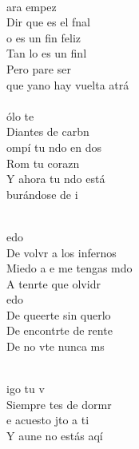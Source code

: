 \begin{cancion}[Miedo][M Clan]%
	    \\
	ara empez\\
	Dir que es el fnal\\
	o es un fin feliz\\
	Tan lo es un finl \\
	Pero pare ser \\
	que yano hay vuelta atrá    \\
\jump\\
	ólo te \\
	Diantes de carbn \\
	ompí tu ndo en dos\\
	Rom tu corazn  \\
	Y ahora tu ndo está\\
	burándose de i       \\\jump\\
	\begin{chorus}%
	edo\\
	De volvr a los infernos\\
	Miedo a e me tengas mdo\\
	A tenrte que olvidr      \\
	edo\\
	De queerte sin querlo\\
	De encontrte de rente\\
	De no vte nunca ms \\
	\end{chorus}%
	\jump\\
	igo tu v\\
	Siempre tes de dormr\\
	e acuesto jto a ti\\
	Y aune no estás aqí\\

\end{cancion}
